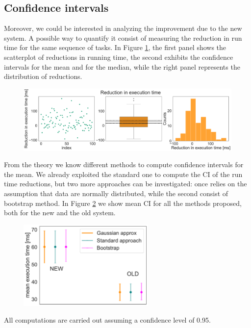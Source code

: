 \documentclass[twoside,onecolumn]{article}
\theoremstyle{definition}
\begin{document}
\subsection{Confidence intervals}
Moreover, we could be interested in analyzing the improvement due to the new system. A possible way to quantify it consist of measuring the reduction in run time for the same sequence of tasks. In Figure \ref{fig:reduction}, the first panel shows the scatterplot of reductions in running time, the second exhibits the confidence intervals for the mean and for the median, while the right panel represents the distribution of reductions.
\begin{figure} \centering
\includegraphics[width=1\textwidth]{../figs/extimes_reduction.pdf}
\caption{}\label{fig:reduction}
\end{figure}

From the theory we know different methods to compute confidence intervals for the mean. We already exploited the standard one to compute the CI of the run time reductions, but two more approaches can be investigated: once relies on the assumption that data are normally distributed, while the second consist of bootstrap method. In Figure \ref{fig:ci_methods} we show mean CI for all the methods proposed, both for the new and the old system.


\begin{figure} \centering
\includegraphics[width=0.6\textwidth]{../figs/CI_methods_comparison.pdf}
\caption{}\label{fig:ci_methods}
\end{figure}

All computations are carried out assuming a confidence level of 0.95.
\end{document}
